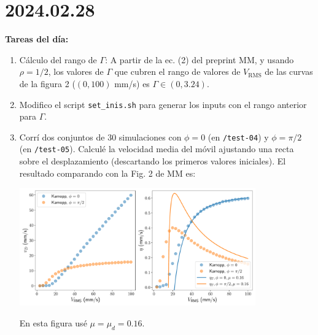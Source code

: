 \documentclass[11pt]{article}
\begin{document}
\section*{2024.02.28}
\textbf{Tareas del día:}
\begin{enumerate}
    \item Cálculo del rango de $\Gamma$: A partir de la ec. (2) del preprint MM, y usando $\rho = 1/2$, los valores de $\Gamma$ que cubren el rango de valores de $V_{\text{RMS}}$ de las curvas de la figura 2 ($(0, 100)$ \unit{mm/s}) es $\Gamma \in (0, 3.24)$.
    \item Modifico el script \texttt{set\_inis.sh} para generar los inputs con el rango anterior para $\Gamma$.
    \item Corrí dos conjuntos de 30 simulaciones con $\phi = 0$ (en \texttt{/test-04}) y $\phi = \pi/2$ (en \texttt{/test-05}). Calculé la velocidad media del móvil ajustando una recta sobre el desplazamiento (descartando los primeros valores iniciales). El resultado comparando con la Fig. 2 de MM es: 
        \begin{center}
            \includegraphics[width=0.8\textwidth]{figs/Fig_2_MM.pdf}
        \end{center}
        En esta figura usé $\mu = \mu_d = 0.16$.
\end{enumerate}
\end{document}

